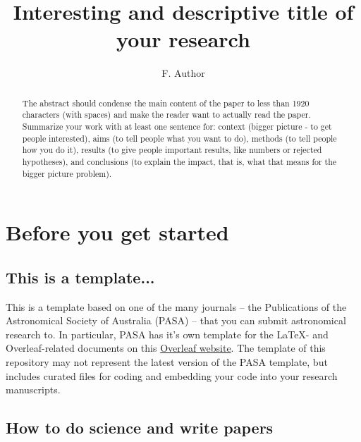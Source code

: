\documentclass[
  journal=pasa,
  manuscript=Research-Article,
  year=2025,
  volume=X,
]{cup-journal}
\title{Interesting and descriptive title of your research}
\author{F. Author \orcidlink{0000-0000-0000-0000}}
\affiliation{Research School of Astronomy and Astrophysics, Australian National University, Canberra, ACT 2611, Australia}
\begin{document}
\begin{abstract}
The abstract should condense the main content of the paper to less than 1920 characters (with spaces) and make the reader want to actually read the paper. Summarize your work with at least one sentence for: context (bigger picture - to get people interested), aims (to tell people what you want to do), methods (to tell people how you do it), results (to give people important results, like numbers or rejected hypotheses), and conclusions (to explain the impact, that is, what that means for the bigger picture problem).
\end{abstract}

\section{Before you get started}

\subsection{This is a template...}

This is a template based on one of the many journals -- the Publications of the Astronomical Society of Australia (PASA) -- that you can submit astronomical research to. In particular, PASA has it's own template for the \LaTeX- and Overleaf-related documents on this \href{https://www.overleaf.com/latex/templates/cup-large2-template/sbvfyncxcbcm}{Overleaf website}. The template of this repository may not represent the latest version of the PASA template, but includes curated files for coding and embedding your code into your research manuscripts.

\subsection{How to do science and write papers}
\end{document}
